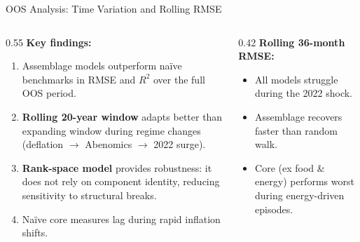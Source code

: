 \documentclass[aspectratio=169, 11pt]{beamer}
\begin{document}
\begin{frame}{OOS Analysis: Time Variation and Rolling RMSE}
  \begin{columns}[T]
    \begin{column}{0.55\textwidth}
      \textbf{Key findings:}
      \begin{enumerate}
        \item Assemblage models \alert{outperform} na\"ive benchmarks in RMSE and $R^2$
              over the full OOS period.
        \item \textbf{Rolling 20-year window} adapts better than expanding window during
              regime changes (deflation $\to$ Abenomics $\to$ 2022 surge).
        \item \textbf{Rank-space model} provides robustness: it does not rely on
              component identity, reducing sensitivity to structural breaks.
        \item Na\"ive core measures lag during rapid inflation shifts.
      \end{enumerate}
    \end{column}
    \begin{column}{0.42\textwidth}
      \textbf{Rolling 36-month RMSE:}
      \begin{itemize}
        \item All models struggle during the 2022 shock.
        \item Assemblage recovers faster than random walk.
        \item Core (ex food \& energy) performs worst
              during energy-driven episodes.
      \end{itemize}
    \end{column}
  \end{columns}
\end{frame}
\end{document}
